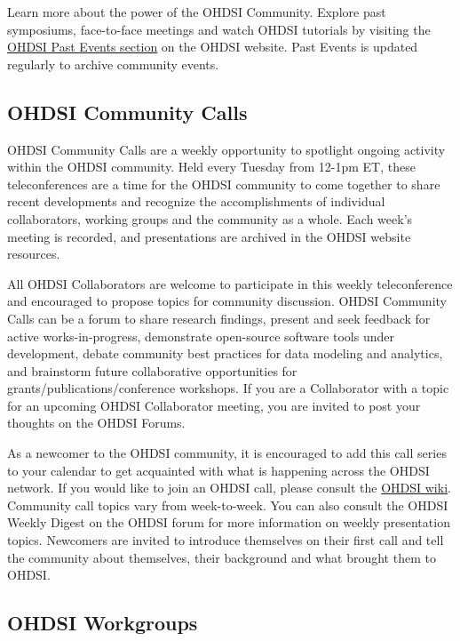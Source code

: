 \documentclass[11pt]{book}
\theoremstyle{definition}
\theoremstyle{definition}
\theoremstyle{definition}
\theoremstyle{remark}
\begin{document}
Learn more about the power of the OHDSI Community. Explore past
symposiums, face-to-face meetings and watch OHDSI tutorials by visiting
the \href{https://www.ohdsi.org/past-events/}{OHDSI Past Events section}
on the OHDSI website. Past Events is updated regularly to archive
community events.

\subsection{OHDSI Community Calls}\label{ohdsi-community-calls}

OHDSI Community Calls are a weekly opportunity to spotlight ongoing
activity within the OHDSI community. Held every Tuesday from 12-1pm ET,
these teleconferences are a time for the OHDSI community to come
together to share recent developments and recognize the accomplishments
of individual collaborators, working groups and the community as a
whole. Each week's meeting is recorded, and presentations are archived
in the OHDSI website resources.

All OHDSI Collaborators are welcome to participate in this weekly
teleconference and encouraged to propose topics for community
discussion. OHDSI Community Calls can be a forum to share research
findings, present and seek feedback for active works-in-progress,
demonstrate open-source software tools under development, debate
community best practices for data modeling and analytics, and brainstorm
future collaborative opportunities for grants/publications/conference
workshops. If you are a Collaborator with a topic for an upcoming OHDSI
Collaborator meeting, you are invited to post your thoughts on the OHDSI
Forums.

As a newcomer to the OHDSI community, it is encouraged to add this call
series to your calendar to get acquainted with what is happening across
the OHDSI network. If you would like to join an OHDSI call, please
consult the
\href{https://www.ohdsi.org/web/wiki/doku.php?id=projects:ohdsi_community}{OHDSI
wiki}. Community call topics vary from week-to-week. You can also
consult the OHDSI Weekly Digest on the OHDSI forum for more information
on weekly presentation topics. Newcomers are invited to introduce
themselves on their first call and tell the community about themselves,
their background and what brought them to OHDSI.

\subsection{OHDSI Workgroups}\label{ohdsi-workgroups}
\end{document}
